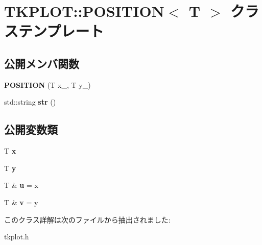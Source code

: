 \hypertarget{class_t_k_p_l_o_t_1_1_p_o_s_i_t_i_o_n}{}\section{T\+K\+P\+L\+OT\+:\+:P\+O\+S\+I\+T\+I\+ON$<$ T $>$ クラステンプレート}
\label{class_t_k_p_l_o_t_1_1_p_o_s_i_t_i_o_n}
\subsection*{公開メンバ関数}
\begin{DoxyCompactItemize}
\item 
\mbox{\label{class_t_k_p_l_o_t_1_1_p_o_s_i_t_i_o_n_abce2e3b6b659c15133abef1c6e35fe1c}} 
{\bfseries P\+O\+S\+I\+T\+I\+ON} (T x\+\_\+, T y\+\_\+)
\item 
\mbox{\label{class_t_k_p_l_o_t_1_1_p_o_s_i_t_i_o_n_a715ead8ec7884aaca1ec220e77c83b03}} 
std\+::string {\bfseries str} ()
\end{DoxyCompactItemize}
\subsection*{公開変数類}
\begin{DoxyCompactItemize}
\item 
\mbox{\label{class_t_k_p_l_o_t_1_1_p_o_s_i_t_i_o_n_a260fc49a5e31e7dd5d42fc01b05a88f7}} 
T {\bfseries x}
\item 
\mbox{\label{class_t_k_p_l_o_t_1_1_p_o_s_i_t_i_o_n_ae84c7221f133098571c5389d76285591}} 
T {\bfseries y}
\item 
\mbox{\label{class_t_k_p_l_o_t_1_1_p_o_s_i_t_i_o_n_a023ad2c7a8239540613a5b18c70772ff}} 
T \& {\bfseries u} = x
\item 
\mbox{\label{class_t_k_p_l_o_t_1_1_p_o_s_i_t_i_o_n_a776d51b19318a7177128c435eae80a48}} 
T \& {\bfseries v} = y
\end{DoxyCompactItemize}


このクラス詳解は次のファイルから抽出されました\+:\begin{DoxyCompactItemize}
\item 
tkplot.\+h\end{DoxyCompactItemize}
